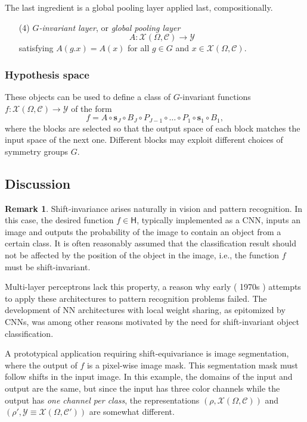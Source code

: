 \documentclass[12pt]{article}
\numberwithin{equation}{section}
\theoremstyle{definition}
\newtheorem{rmk}[thm]{Remark}
\newcommand{		\1		}	{	\bm{1}					}%
\begin{document}
The last ingredient is a global pooling layer applied last, compositionally. 

\begin{enumerate}
\item[(4)] \emph{$G$-invariant layer}, or \emph{global pooling layer} $\quad$ 
	$$
	A : \mathcal{X} (\Omega, \mathcal{C}) \to \mathcal{Y}
	$$ 
	satisfying $A(g.x) = A(x)$ for all $g \in G$ and $x \in \mathcal{X}(\Omega, \mathcal{C})$. 
\end{enumerate}


\subsubsection*{Hypothesis space} 

These objects can be used to define a class of $G$-invariant functions $f: \mathcal{X}(\Omega, \mathcal{C}) \to \mathcal{Y}$ of the form
    $$
    f = A \circ \mathbf{s}_J \circ B_J \circ P_{J-1} \circ \dots \circ P_1 \circ \mathbf{s}_1 \circ B_1 ,
    $$
where the blocks are selected so that the output space of each block matches the input space of the next one. Different blocks may exploit different choices of symmetry groups $G$.

\subsection{Discussion} 


\begin{rmk}
Shift-invariance arises naturally in vision and pattern recognition. In this case, the desired function $f \in \textsf{H}$, typically implemented as a CNN, inputs an image and outputs the probability of the image to contain an object from a certain class. It is often reasonably assumed that the classification result should not be affected by the position of the object in the image, i.e., the function $f$ must be shift-invariant.

Multi-layer perceptrons lack this property, a reason why early ( 1970s ) attempts to apply these architectures to pattern recognition problems failed. The development of NN architectures with local weight sharing, as epitomized by CNNs, was among other reasons motivated by the need for shift-invariant object classification. 

A prototypical application requiring shift-equivariance is image segmentation, where the output of $f$ is a pixel-wise image mask. This segmentation mask must follow shifts in the input image. In this example, the domains of the input and output are the same, but since the input has three color channels while the output has \emph{one channel per class}, the representations $(\rho, \mathcal{X}(\Omega, \mathcal{C}) )$ and $(\rho', \mathcal{Y} \equiv \mathcal{X}(\Omega, \mathcal{C}'))$ are somewhat different. 
\end{rmk}
\end{document}
